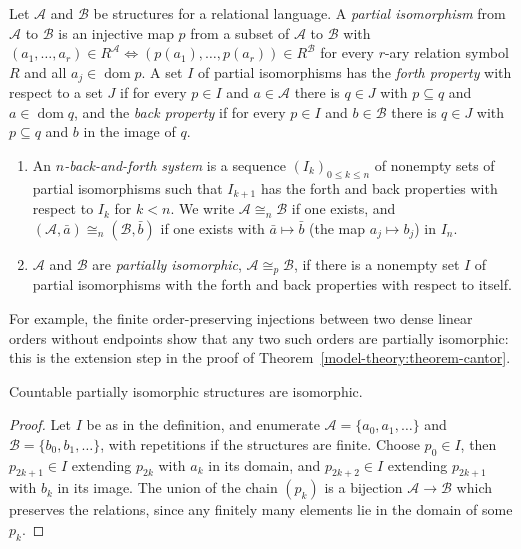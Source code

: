 \begin{definition}\label{model-theory:definition-partial-isomorphism}
Let $\mathcal{A}$ and $\mathcal{B}$ be structures for a relational language. A \emph{partial isomorphism} from $\mathcal{A}$ to $\mathcal{B}$ is an injective map
$p$ from a subset of $\mathcal{A}$ to $\mathcal{B}$ with $(a_1, \ldots, a_r) \in R^{\mathcal{A}} \iff (p(a_1), \ldots, p(a_r)) \in R^{\mathcal{B}}$ for every
$r$-ary relation symbol $R$ and all $a_j \in \operatorname{dom}p$. A set $I$ of partial isomorphisms has the \emph{forth property} with respect to a set $J$ if for
every $p \in I$ and $a \in \mathcal{A}$ there is $q \in J$ with $p \subseteq q$ and $a \in \operatorname{dom}q$, and the \emph{back property} if for every
$p \in I$ and $b \in \mathcal{B}$ there is $q \in J$ with $p \subseteq q$ and $b$ in the image of $q$.
\begin{enumerate}
\item An \emph{$n$-back-and-forth system} is a sequence $(I_k)_{0 \leq k \leq n}$ of nonempty sets of partial isomorphisms such that $I_{k+1}$ has the forth and
back properties with respect to $I_k$ for $k < n$. We write $\mathcal{A} \cong_n \mathcal{B}$ if one exists, and
$(\mathcal{A}, \bar{a}) \cong_n (\mathcal{B}, \bar{b})$ if one exists with $\bar{a} \mapsto \bar{b}$ (the map $a_j \mapsto b_j$) in $I_n$.
\item $\mathcal{A}$ and $\mathcal{B}$ are \emph{partially isomorphic}, $\mathcal{A} \cong_p \mathcal{B}$, if there is a nonempty set $I$ of partial isomorphisms
with the forth and back properties with respect to itself.
\end{enumerate}
\end{definition}

For example, the finite order-preserving injections between two dense linear orders without endpoints show that any two such orders are partially
isomorphic: this is the extension step in the proof of Theorem~\ref{model-theory:theorem-cantor}.

\begin{lemma}\label{model-theory:lemma-countable-partial-isomorphism}
Countable partially isomorphic structures are isomorphic.
\end{lemma}

\begin{proof}
Let $I$ be as in the definition, and enumerate $\mathcal{A} = \{a_0, a_1, \ldots\}$ and $\mathcal{B} = \{b_0, b_1, \ldots\}$, with repetitions if the structures
are finite. Choose $p_0 \in I$, then $p_{2k+1} \in I$ extending $p_{2k}$ with $a_k$ in its domain, and $p_{2k+2} \in I$ extending $p_{2k+1}$ with $b_k$ in its
image. The union of the chain $(p_k)$ is a bijection $\mathcal{A} \to \mathcal{B}$ which preserves the relations, since any finitely many elements lie in the
domain of some $p_k$.
\end{proof}

